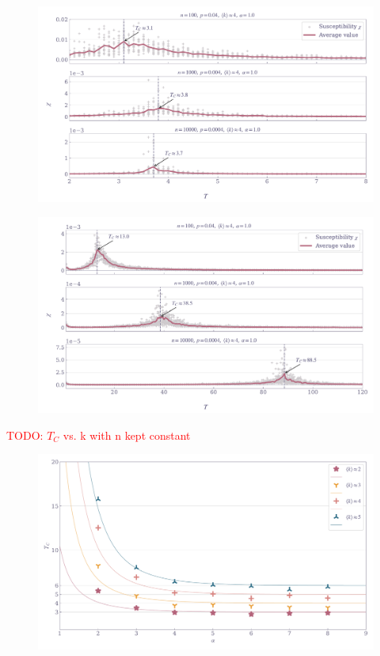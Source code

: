 \documentclass[11pt,a4paper]{article}
\newcommand{\todo}[1]{\textcolor{red}{TODO: #1}}
\begin{document}
\begin{figure}[ht!]
    \includegraphics[width=\linewidth]{../figures/suscept_ER_nearest.pdf}
\end{figure}


\begin{figure}[ht!]
    \includegraphics[width=\linewidth]{../figures/suscept_ER_single.pdf}
\end{figure}

\todo{$T_C$ vs. k with n kept constant}
\begin{figure}[ht!]
    \includegraphics[width=\linewidth]{../figures/TC_vs_alpha.pdf}
\end{figure}
\end{document}
